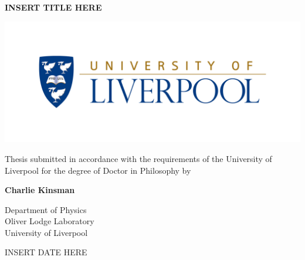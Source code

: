 \thispagestyle{empty}
\vfill
\begin{center}
	\begin{minipage}{1\linewidth}
		\centering
		\vspace{2cm}		
		\textbf{\huge INSERT TITLE HERE}\par
		\vspace{1cm}
		\includegraphics[width=1\textwidth]{./fig/title/logo.png} \par
		\vspace{1cm}
		{\Large Thesis submitted in accordance with the requirements of the University of Liverpool for the degree of Doctor in Philosophy by} \par
		\vspace{1cm}
		\Large \textbf{Charlie Kinsman} \par
		\vspace{1cm}
		\large
		Department of Physics \\
		Oliver Lodge Laboratory \\
		University of Liverpool \\ \par
		\vspace{2cm}
		{\Large INSERT DATE HERE}
	\end{minipage}
\end{center}
\vfill
\clearpage